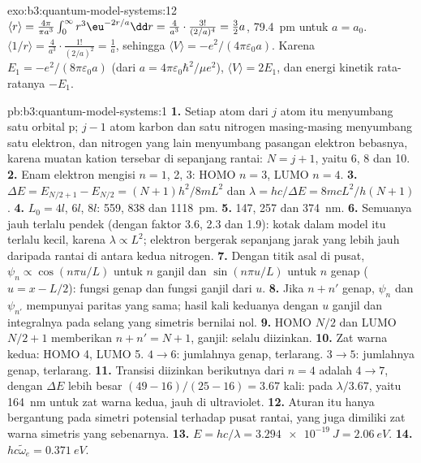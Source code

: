 \begin{solution}{exo:b3:quantum-model-systems:12}
$\langle r\rangle = \frac{4\pi}{\pi a^3}\int_0^\infty r^3\eu^{-2r/a}\dd r =
\frac{4}{a^3}\cdot\frac{3!}{(2/a)^4} = \frac32a$, \qty{79.4}{pm} untuk $a = a_0$.
$\langle 1/r\rangle = \frac{4}{a^3}\cdot\frac{1!}{(2/a)^2} = \frac1a$, sehingga
$\langle V\rangle = -e^2/(4\pi\varepsilon_0a)$. Karena $E_1 =
-e^2/(8\pi\varepsilon_0a)$ (dari $a = 4\pi\varepsilon_0\hbar^2/\mu e^2$),
$\langle V\rangle = 2E_1$, dan energi kinetik rata-ratanya $-E_1$.
\end{solution}

\begin{solution}{pb:b3:quantum-model-systems:1}
\textbf{1.} Setiap atom dari $j$ atom itu menyumbang satu orbital p; $j - 1$
atom karbon dan satu nitrogen masing-masing menyumbang satu elektron, dan
nitrogen yang lain menyumbang pasangan elektron bebasnya, karena muatan kation
tersebar di sepanjang rantai: $N = j + 1$, yaitu 6, 8 dan 10.
\textbf{2.} Enam elektron mengisi $n = 1$, 2, 3: HOMO $n = 3$, LUMO $n = 4$.
\textbf{3.} $\Delta E = E_{N/2+1} - E_{N/2} = (N+1)h^2/8mL^2$ dan $\lambda =
hc/\Delta E = 8mcL^2/h(N+1)$.
\textbf{4.} $L_0 = 4l$, $6l$, $8l$: 559, 838 dan \qty{1118}{pm}.
\textbf{5.} 147, 257 dan \qty{374}{nm}.
\textbf{6.} Semuanya jauh terlalu pendek (dengan faktor 3.6, 2.3 dan 1.9):
kotak dalam model itu terlalu kecil, karena $\lambda \propto L^2$; elektron
bergerak sepanjang jarak yang lebih jauh daripada rantai di antara kedua
nitrogen.
\textbf{7.} Dengan titik asal di pusat, $\psi_n \propto \cos(n\pi u/L)$ untuk
$n$ ganjil dan $\sin(n\pi u/L)$ untuk $n$ genap ($u = x - L/2$): fungsi genap
dan fungsi ganjil dari $u$.
\textbf{8.} Jika $n + n'$ genap, $\psi_n$ dan $\psi_{n'}$ mempunyai paritas
yang sama; hasil kali keduanya dengan $u$ ganjil dan integralnya pada selang
yang simetris bernilai nol.
\textbf{9.} HOMO $N/2$ dan LUMO $N/2 + 1$ memberikan $n + n' = N + 1$, ganjil:
selalu diizinkan.
\textbf{10.} Zat warna kedua: HOMO 4, LUMO 5. $4 \to 6$: jumlahnya genap,
terlarang. $3 \to 5$: jumlahnya genap, terlarang.
\textbf{11.} Transisi diizinkan berikutnya dari $n = 4$ adalah $4 \to 7$,
dengan $\Delta E$ lebih besar $(49 - 16)/(25 - 16) = 3.67$ kali: pada
$\lambda/3.67$, yaitu \qty{164}{nm} untuk zat warna kedua, jauh di ultraviolet.
\textbf{12.} Aturan itu hanya bergantung pada simetri potensial terhadap
pusat rantai, yang juga dimiliki zat warna simetris yang sebenarnya.
\textbf{13.} $E = hc/\lambda = \qty{3.294e-19}{J} = \qty{2.06}{eV}$.
\textbf{14.} $hc\tilde\omega_e = \qty{0.371}{eV}$.

\end{solution}
